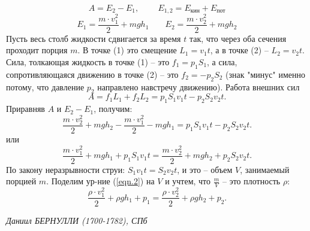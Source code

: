 \begin{displaymath}
A=E_2-E_1,\;\;\;\;\;\;\;\;E_{1,2}=E_\texttt{кин}+E_\texttt{пот}
\end{displaymath}
\begin{displaymath}
E_1=\frac{m\cdot v_1^2}2+mgh_1\;\;\;\;\;\;\;E_2=\frac{m\cdot v_2^2}2+mgh_2
\end{displaymath}
Пусть весь столб жидкости сдвигается за время $t$ так, что через оба сечения проходит порция $m$. В точке (1) это смещение $L_1=v_1t$, а в точке (2) -- $L_2=v_2t$. Сила, толкающая жидкость в точке (1) -- это $f_1=p_1S_1$, а сила, сопротивляющаяся движению в точке (2) -- это $f_2=-p_2S_2$ (знак "минус" именно потому, что давление $p_2$ направлено навстречу движению). Работа внешних сил
\begin{displaymath}
A=f_1L_1+f_2L_2=p_1S_1v_1t-p_2S_2v_2t.
\end{displaymath}
Приравняв $A$ и $E_2-E_1$, получим:
\begin{displaymath}
\frac{m\cdot v_2^2}2+mgh_2-\frac{m\cdot v_1^2}2-mgh_1=p_1S_1v_1t-p_2S_2v_2t.
\end{displaymath}или
\begin{equation}\label{eqn.2}
 \frac{m\cdot v_1^2}2+mgh_1+p_1S_1v_1t=\frac{m\cdot v_2^2}2+mgh_2+p_2S_2v_2t.
\end{equation}
По закону неразрывности струи: $S_1v_1t=S_2v_2t$, и это -- объем $V$, занимаемый порцией $m$. Поделим ур-ние (\ref{eqn.2}) на $V$ и учтем, что $\frac mV$ -- это плотность $\rho$:
{\color{blue}
\begin{displaymath}
\frac{\rho\cdot v_1^2}2+\rho gh_1+p_1=\frac{\rho\cdot v_2^2}2+\rho gh_2+p_2.
\end{displaymath}
}
\begin{flushright}{\sl Даниил БЕРНУЛЛИ (1700-1782), СПб}\end{flushright}

